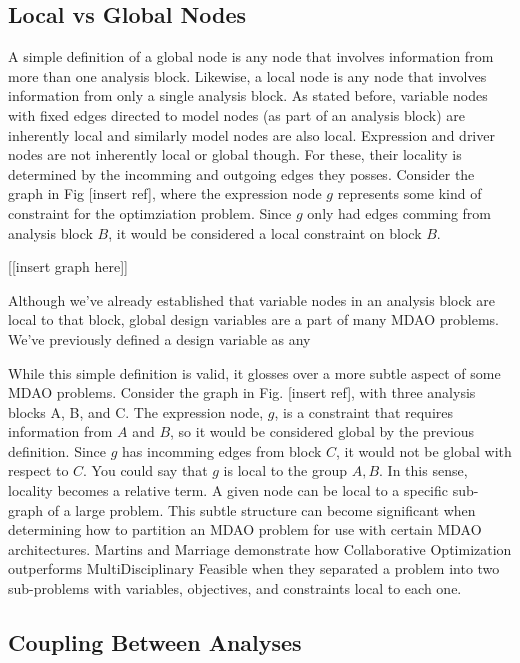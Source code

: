 \subsection{Local vs Global Nodes}

A simple definition of a global node is any node that involves information 
from more than one analysis block. Likewise, a local node is any node 
that involves information from only a single analysis block. As stated before, variable 
nodes with fixed edges directed to model nodes (as part of an analysis block) are inherently local 
and similarly model nodes are also local. Expression and driver nodes
are not inherently local or global though. For these, their locality is determined 
by the incomming and outgoing edges they posses. Consider the graph in Fig [insert ref], 
where the expression node $g$ represents some kind of constraint for the optimziation problem. 
Since $g$ only had edges comming from analysis block $B$, it would be considered a local constraint 
on block $B$. 

[[insert graph here]]

Although we've already established that variable nodes in an analysis block are local to that 
block, global design variables are a part of many MDAO problems. We've previously defined 
a design variable as any 

While this simple definition is valid, it glosses over a more subtle aspect of 
some MDAO problems. Consider the graph in Fig. [insert ref], with three analysis 
blocks A, B, and C. The expression node, $g$, is a constraint that requires information 
from $A$ and $B$, so it would be considered global by the previous definition. Since $g$
has incomming edges from block $C$, it would not be global with respect to $C$. 
You could say that $g$ is local to the group $A,B$. In this sense, locality 
becomes a relative term. A given node can be local to a specific sub-graph of a large
problem. This subtle structure can become significant when determining how to partition 
an MDAO problem for use with certain MDAO architectures. Martins and Marriage 
demonstrate how Collaborative Optimization outperforms MultiDisciplinary Feasible
when they separated a problem into two sub-problems with variables, objectives, and 
constraints local to each one\cite{Marriage2008a}. 


\subsection{Coupling Between Analyses}


